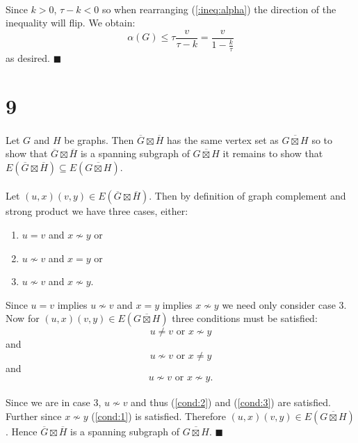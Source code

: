 \documentclass[letterpaper,12pt,oneside,onecolumn]{article}
\newcommand{\1}{\mathbbm{1}}
\begin{document}
\paragraph{}
Since $k > 0$, $\tau - k < 0$ so when rearranging (\ref{:ineq:alpha}) the direction of the inequality will flip. We obtain:
$$\alpha(G) \leq \tau\frac{v}{\tau-k} = \frac{v}{1-\frac{k}{\tau}}$$
as desired. $\blacksquare$
\section*{9}
\paragraph{}
Let $G$ and $H$ be graphs. Then $\overline{G} \boxtimes \overline{H}$ has the same vertex set as $\overline{G\boxtimes H}$ so to show that $\overline{G} \boxtimes \overline{H}$ is a spanning subgraph of $\overline{G\boxtimes H}$ it remains to show that $E(\overline{G} \boxtimes \overline{H})\subseteq E(\overline{G\boxtimes H})$.
\paragraph{}
Let $(u,x) (v,y) \in E(\overline{G} \boxtimes \overline{H})$. Then by definition of graph complement and strong product we have three cases, either:
\begin{enumerate}
\item $u = v$ and $x \not\sim y$ or
\item $u \not\sim v$ and $x = y$ or
\item $u \not\sim v$ and $x \not\sim y$.
\end{enumerate}
Since $u = v$ implies $u \not \sim v$ and $x = y$ implies $x \not \sim y$ we need only consider case $3$. Now for $(u,x)(v,y) \in E(\overline{G\boxtimes H})$ three conditions must be satisfied:
\begin{equation} u \neq v \text{ or } x\not\sim y \label{cond:1}\end{equation}
and
\begin{equation} u \not\sim v \text{ or } x \neq y \label{cond:2}\end{equation}
and
\begin{equation} u \not\sim v \text{ or } x\not\sim y.\label{cond:3}\end{equation}
\paragraph{}
Since we are in case $3$, $u\not\sim v$ and thus (\ref{cond:2}) and (\ref{cond:3}) are satisfied. Further since $x \not\sim y$ (\ref{cond:1}) is satisfied. Therefore $(u,x)(v,y) \in E(\overline{G\boxtimes H})$. Hence $\overline{G} \boxtimes \overline{H}$ is a spanning subgraph of $\overline{G\boxtimes H}$. $\blacksquare$
\end{document}
